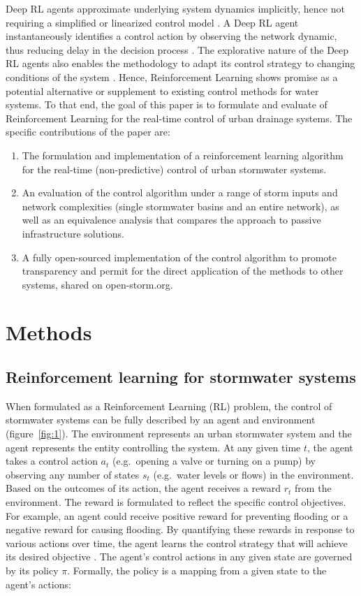 Deep RL agents approximate underlying system dynamics implicitly, hence not requiring a simplified or linearized control model \cite{Sutton98}.
A Deep RL agent instantaneously identifies a control action by observing the network dynamic, thus reducing delay in the decision process \cite{Mnih2015, Silver2017MasteringAlgorithm}.
The explorative nature of the Deep RL agents also enables the methodology to adapt its control strategy to changing conditions of the system \cite{Sutton98}.
Hence, Reinforcement Learning shows promise as a potential alternative or supplement to existing control methods for water systems.
To that end, the goal of this paper is to formulate and evaluate of Reinforcement Learning for the real-time control of urban drainage systems.
The specific contributions of the paper are:
\begin{enumerate}
    \item The formulation and implementation of a reinforcement learning algorithm for the real-time (non-predictive) control of urban stormwater systems.
    \item An evaluation of the control algorithm under a range of storm inputs and network complexities (single stormwater basins and an entire network), as well as an equivalence analysis that compares the approach to passive infrastructure solutions.
    \item A fully open-sourced implementation of the control algorithm to promote transparency and permit for the direct application of the methods to other systems, shared on open-storm.org.
\end{enumerate}

\section{Methods}
\subsection{Reinforcement learning for stormwater systems}
When formulated as a Reinforcement Learning (RL) problem, the control of stormwater systems can be fully described by an agent and environment (figure~\ref{fig:1}).
The environment represents an urban stormwater system and the agent represents the entity controlling the system.
At any given time $t$, the agent takes a control action $a_t$ (e.g.\ opening a valve or turning on a pump) by observing any number of states $s_t$ (e.g.\ water levels or flows) in the environment.
Based on the outcomes of its action, the agent receives a reward $r_t$ from the environment.
The reward is formulated to reflect the specific control objectives.
For example, an agent could receive positive reward for preventing flooding or a negative reward for causing flooding.
By quantifying these rewards in response to various actions over time, the agent learns the control strategy that will achieve its desired objective \cite{Sutton98}.
The agent's control actions in any given state are governed by its policy $\pi$. Formally, the policy is a mapping from a given state to the agent’s actions:

